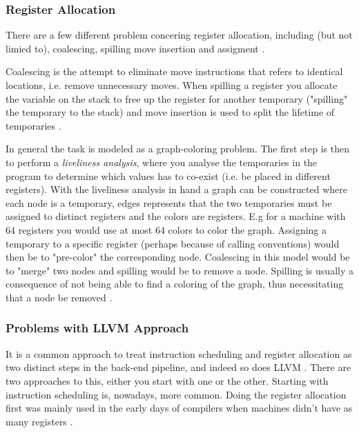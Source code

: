 \subsubsection{Register Allocation}

There are a few different problem concering register allocation, including (but not limied
to), coalescing, spilling move insertion and assigment \cite{alloc-deconstructed,
llvm-codegenerator-allocation}.

Coalescing is the attempt to eliminate move instructions that refers to identical locations,
i.e. remove unnecessary moves. When spilling a register you allocate the variable on the
stack to free up the register for another temporary ("spilling" the temporary to the stack)
and move insertion is used to split the lifetime of temporaries \cite{alloc-deconstructed}.

In general the task is modeled as a graph-coloring problem. The first step is then to
perform a \textit{liveliness analysis}, where you analyse the temporaries in the program
to determine which values has to co-exist (i.e. be placed in different registers). With
the liveliness analysis in hand a graph can be constructed where each node is a temporary,
edges represents that the two temporaries must be assigned to distinct registers and the
colors are registers. E.g for a machine with 64 registers you would use at most 64 colors
to color the graph. Assigning a temporary to a specific register (perhaps because of
calling conventions) would then be to "pre-color" the corresponding node. Coalescing in
this model would be to "merge" two nodes and spilling would be to remove a node. Spilling
is usually a consequence of not being able to find a coloring of the graph, thus
necessitating that a node be removed \cite{alloc-deconstructed}.

\subsubsection{Problems with LLVM Approach}
It is a common approach to treat instruction scheduling and register allocation as two
distinct steps in the back-end pipeline, and indeed so does LLVM \cite[Section~11.5]{aosa-llvm}.
There are two approaches to this, either you start with one or the other. Starting with
instruction scheduling is, nowadays, more common. Doing the register allocation first was
mainly used in the early days of compilers when machines didn't have as many registers
\cite[\pno~3]{combining-alloc-sched}.


